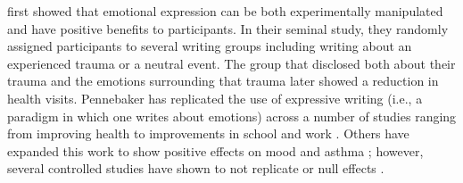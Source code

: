 \documentclass[english,man]{apa6}
\theoremstyle{definition}
\theoremstyle{definition}
\theoremstyle{definition}
\theoremstyle{remark}
\begin{document}
\textcite{Pennebaker1986} first showed that emotional expression can be
both experimentally manipulated and have positive benefits to
participants. In their seminal study, they randomly assigned
participants to several writing groups including writing about an
experienced trauma or a neutral event. The group that disclosed both
about their trauma and the emotions surrounding that trauma later showed
a reduction in health visits. Pennebaker has replicated the use of
expressive writing (i.e., a paradigm in which one writes about emotions)
across a number of studies ranging from improving health
\autocites{Pennebaker1988}{Pennebaker1990} to improvements in school
\autocite{Pennebaker1996} and work \autocite{Francis1992}. Others have
expanded this work to show positive effects on mood
\autocite{Schoutrop2002} and asthma \autocite{Smyth1999}; however,
several controlled studies have shown to not replicate
\autocite{Harris2005} or null effects
\autocites{Gidron1996a}{Walker1999a}.
\end{document}
